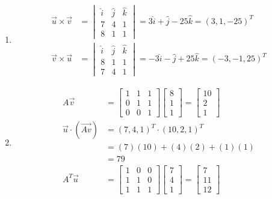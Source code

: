 \begin{Answer}
\begin{enumerate}[label=(\alph*)]
\item 
\begin{align*}
\vec{u} \times \vec{v} &= 
\begin{vmatrix}
\hat{i} & \hat{j} & \hat{k}\\
7 & 4 & 1\\
8 & 1 & 1    
\end{vmatrix}
= 3\hat{i} + \hat{j} - 25\hat{k} = (3, 1, -25)^T \\
\vec{v} \times \vec{u} &=
\begin{vmatrix}
\hat{i} & \hat{j} & \hat{k}\\
8 & 1 & 1 \\  
7 & 4 & 1
\end{vmatrix}
= -3\hat{i} - \hat{j} + 25\hat{k} = (-3, -1, 25)^T
\end{align*} 
\item 
\begin{align*}
A\vec{v} &= 
\begin{bmatrix}
1 & 1 & 1\\
0 & 1 & 1\\
0 & 0 & 1
\end{bmatrix}
\begin{bmatrix}
8 \\
1 \\
1
\end{bmatrix}
=
\begin{bmatrix}
10 \\
2 \\
1
\end{bmatrix} \\
\vec{u} \cdot (\vec{Av}) 
&= (7, 4, 1)^T \cdot (10, 2, 1)^T \\
&= (7)(10) + (4)(2) + (1)(1) \\
&= 79 \\
A^T\vec{u} &= 
\begin{bmatrix}
1 & 0 & 0\\
1 & 1 & 0\\
1 & 1 & 1
\end{bmatrix}
\begin{bmatrix}
7 \\ 
4 \\
1
\end{bmatrix}
=
\begin{bmatrix}
7 \\
11 \\
12
\end{bmatrix} \\

\end{align*}
\end{enumerate}
\end{Answer}
